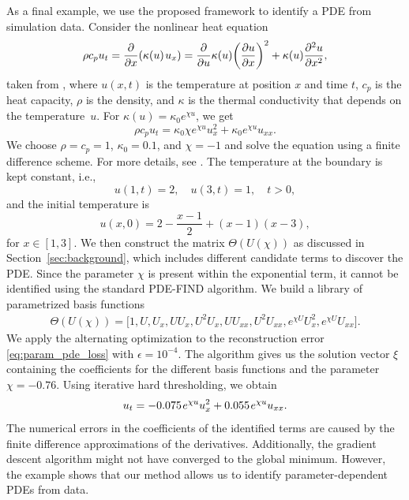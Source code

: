 \documentclass
[
    a4paper,
    DIV=11,
    abstract=true,
    11pt,
]
{scrartcl}
\newcommand{\ts}{\hspace*{0.1em}}                                %
\theoremstyle{definition}
\begin{document}
As a final example, we use the proposed framework to identify a PDE from simulation data. Consider the nonlinear heat equation
\begin{equation*}
    \rho c_p u_t = \frac{\partial}{\partial x}(\kappa(u) \ts u_x) = \frac{\partial}{\partial u}\kappa(u) \bigg(\frac{\partial u}{\partial x}\bigg)^2 + \kappa(u)\frac{\partial^2 u}{\partial x^2},
\end{equation*}
taken from \cite{filipov2018implicit}, where $u(x,t)$ is the temperature at position $x$ and time $t$, $c_p$ is the heat capacity, $\rho$ is the density, and $\kappa$ is the thermal conductivity that depends on the temperature~$u$. For $\kappa(u) = \kappa_0 e^{\chi u} $, we get
\begin{equation*}
    \rho c_p u_t = \kappa_0 \chi e^{\chi u} u_x^2 + \kappa_0 e^{\chi u} u_{xx}.
\end{equation*}
We choose $\rho = c_p = 1$, $\kappa_0 = 0.1$, and $\chi = -1$ and solve the equation using a finite difference scheme. For more details, see \cite{filipov2018implicit}. The temperature at the boundary is kept constant, i.e.,
\begin{equation*}
    u(1,t) = 2, \quad u(3,t) = 1, \quad t > 0,
\end{equation*}
and the initial temperature is
\begin{equation*}
    u(x, 0) = 2 - \frac{x - 1}{2} + (x - 1)(x - 3),
\end{equation*}
for $ x \in [1, 3] $. We then construct the matrix $\Theta(U(\chi))$ as discussed in Section~\ref{sec:background}, which includes different candidate terms to discover the PDE. Since the parameter $\chi$ is present within the exponential term, it cannot be identified using the standard PDE-FIND algorithm. We build a library of parametrized basis functions
\begin{align*}
    \Theta(U(\chi)) = \big [1, U, U_x, U U_x, U^2 U_x, U U_{xx}, U^2 U_{xx}, e^{\chi U}U_{x}^2, e^{\chi U} U_{xx}\big].
\end{align*}
We apply the alternating optimization to the reconstruction error \eqref{eq:param_pde_loss} with $\epsilon = 10^{-4}$. The algorithm gives us the solution vector $\xi$ containing the coefficients for the different basis functions and the parameter $\chi = -0.76$. Using iterative hard thresholding, we obtain
\begin{equation*}
    u_t = -0.075 \ts e^{\chi u} u_x^2 + 0.055 \ts e^{\chi u} u_{xx}.
\end{equation*}
The numerical errors in the coefficients of the identified terms are caused by the finite difference approximations of the derivatives. Additionally, the gradient descent algorithm might not have converged to the global minimum. However, the example shows that our method allows us to identify parameter-dependent PDEs from data.
\end{document}
